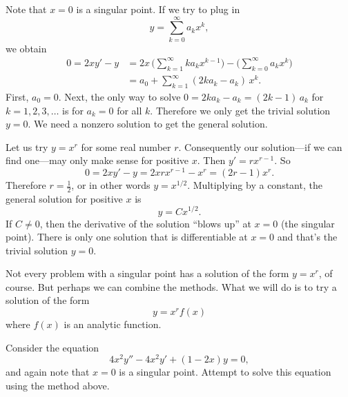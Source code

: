 \documentclass{ximera}
\begin{document}
\begin{exampleSol}
    Note that $x=0$ is a singular point. If we try to plug in
    \begin{equation*}
        y = \sum_{k=0}^\infty a_k x^k ,
    \end{equation*}
    we obtain
    \begin{equation*}
        \begin{split}
            0 = 2 xy'-y 
            &=  2x \, \Biggl( \sum_{k=1}^\infty k a_k x^{k-1}  \Biggr) - \Biggl( \sum_{k=0}^\infty a_k x^k \Biggr) \\
            & = a_0 + \sum_{k=1}^\infty (2 k a_k - a_k) \, x^{k} .
        \end{split}
    \end{equation*}
    First, $a_0 = 0$.  Next, the only way to solve $0 = 2 k a_k - a_k = (2k-1) \, a_k$ for $k = 1,2,3,\dots$ is for $a_k = 0$ for all $k$. Therefore we only get the trivial solution $y=0$.  We need a nonzero solution to get the general solution.
    
    Let us try $y=x^r$ for some real number $r$. Consequently our solution---if we can find one---may only make sense for positive $x$. Then $y' = r x^{r-1}$.  So
    \begin{equation*}
        0 = 2 x y' - y = 2 x r x^{r-1} - x^r = (2r-1) x^r .
    \end{equation*}
    Therefore $r= \frac{1}{2}$, or in other words $y = x^{1/2}$. Multiplying by a constant, the general solution for positive $x$ is
    \begin{equation*}
        y = C x^{1/2} .
    \end{equation*}
    If $C \not= 0$, then the derivative of the solution ``blows up'' at $x=0$ (the singular point).  There is only one solution that is differentiable at $x=0$ and that's the trivial solution $y=0$.
\end{exampleSol}

Not every problem with a singular point has a solution of the form $y=x^r$, of course.  But perhaps we can combine the methods.  What we will do is to try a solution of the form
\begin{equation*}
    y = x^r f(x)
\end{equation*}
where $f(x)$ is an analytic function.

\begin{example}
    Consider the equation
    \begin{equation*}
        4 x^2 y'' - 4 x^2 y' + (1-2x)y = 0,
    \end{equation*}
    and again note that $x=0$ is a singular point. Attempt to solve this equation using the method above.
\end{example}
\end{document}
